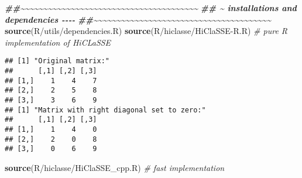 \documentclass[
]{article}
\newenvironment{Shaded}{\begin{snugshade}}{\end{snugshade}}
\newcommand{\CommentTok}[1]{\textcolor[rgb]{0.56,0.35,0.01}{\textit{#1}}}
\newcommand{\DocumentationTok}[1]{\textcolor[rgb]{0.56,0.35,0.01}{\textbf{\textit{#1}}}}
\newcommand{\FunctionTok}[1]{\textcolor[rgb]{0.13,0.29,0.53}{\textbf{#1}}}
\newcommand{\NormalTok}[1]{#1}
\newcommand{\StringTok}[1]{\textcolor[rgb]{0.31,0.60,0.02}{#1}}
\begin{document}
\begin{Shaded}
\begin{Highlighting}[]
\DocumentationTok{\#\#\textasciitilde{}\textasciitilde{}\textasciitilde{}\textasciitilde{}\textasciitilde{}\textasciitilde{}\textasciitilde{}\textasciitilde{}\textasciitilde{}\textasciitilde{}\textasciitilde{}\textasciitilde{}\textasciitilde{}\textasciitilde{}\textasciitilde{}\textasciitilde{}\textasciitilde{}\textasciitilde{}\textasciitilde{}\textasciitilde{}\textasciitilde{}\textasciitilde{}\textasciitilde{}\textasciitilde{}\textasciitilde{}\textasciitilde{}\textasciitilde{}\textasciitilde{}\textasciitilde{}\textasciitilde{}\textasciitilde{}\textasciitilde{}\textasciitilde{}\textasciitilde{}\textasciitilde{}\textasciitilde{}\textasciitilde{}\textasciitilde{}\textasciitilde{}}
\DocumentationTok{\#\#  \textasciitilde{} installations and dependencies  {-}{-}{-}{-}}
\DocumentationTok{\#\#\textasciitilde{}\textasciitilde{}\textasciitilde{}\textasciitilde{}\textasciitilde{}\textasciitilde{}\textasciitilde{}\textasciitilde{}\textasciitilde{}\textasciitilde{}\textasciitilde{}\textasciitilde{}\textasciitilde{}\textasciitilde{}\textasciitilde{}\textasciitilde{}\textasciitilde{}\textasciitilde{}\textasciitilde{}\textasciitilde{}\textasciitilde{}\textasciitilde{}\textasciitilde{}\textasciitilde{}\textasciitilde{}\textasciitilde{}\textasciitilde{}\textasciitilde{}\textasciitilde{}\textasciitilde{}\textasciitilde{}\textasciitilde{}\textasciitilde{}\textasciitilde{}\textasciitilde{}\textasciitilde{}\textasciitilde{}\textasciitilde{}\textasciitilde{}}
\FunctionTok{source}\NormalTok{(}\StringTok{\textquotesingle{}R/utils/dependencies.R\textquotesingle{}}\NormalTok{)}
\FunctionTok{source}\NormalTok{(}\StringTok{\textquotesingle{}R/hiclasse/HiClaSSE{-}R.R\textquotesingle{}}\NormalTok{) }\CommentTok{\# pure R implementation of HiCLaSSE}
\end{Highlighting}
\end{Shaded}

\begin{verbatim}
## [1] "Original matrix:"
##      [,1] [,2] [,3]
## [1,]    1    4    7
## [2,]    2    5    8
## [3,]    3    6    9
## [1] "Matrix with right diagonal set to zero:"
##      [,1] [,2] [,3]
## [1,]    1    4    0
## [2,]    2    0    8
## [3,]    0    6    9
\end{verbatim}

\begin{Shaded}
\begin{Highlighting}[]
\FunctionTok{source}\NormalTok{(}\StringTok{\textquotesingle{}R/hiclasse/HiClaSSE\_cpp.R\textquotesingle{}}\NormalTok{) }\CommentTok{\# fast implementation}
\end{Highlighting}
\end{Shaded}
\end{document}
